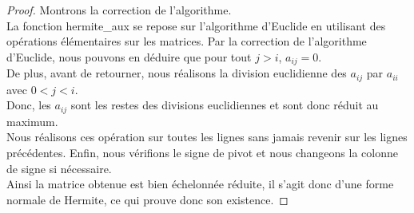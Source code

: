 \documentclass[12pt]{article}
\begin{document}
\begin{proof}
	\noindent
	Montrons la correction de l'algorithme.\\
	La fonction hermite\_aux se repose sur l'algorithme
	d'Euclide en utilisant des opérations élémentaires sur les matrices.
	Par la correction de l'algorithme d'Euclide, nous pouvons en déduire que pour
	tout $j > i$, $a_{ij} = 0$.\\
	De plus, avant de retourner, nous réalisons la division euclidienne des $a_{ij}$ par
	$a_{ii}$ avec $0 < j < i$.\\
	Donc, les $a_{ij}$ sont les restes des divisions euclidiennes et sont donc réduit au maximum.\\
	Nous réalisons ces opération sur toutes les lignes sans jamais revenir sur les lignes précédentes.
	Enfin, nous vérifions le signe de pivot et nous changeons la colonne de signe si nécessaire.\\
	Ainsi la matrice obtenue est bien échelonnée réduite,
	il s'agit donc d'une forme normale de Hermite, ce qui prouve donc son existence.

\end{proof}
\end{document}
